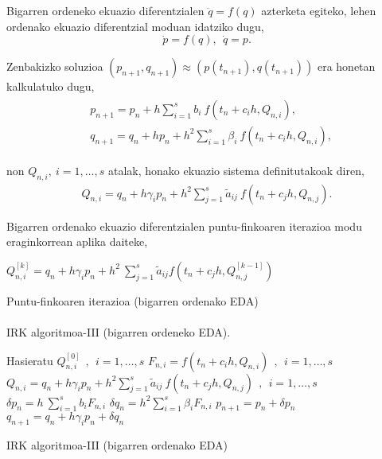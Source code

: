 Bigarren ordeneko ekuazio diferentzialen $\ddot{q}=f(q)$ azterketa egiteko, lehen ordenako ekuazio diferentzial moduan idatziko dugu,
\begin{equation*}
\dot{p}=f(q), \ \ \dot{q}=p.
\end{equation*}

Zenbakizko soluzioa $(p_{n+1},q_{n+1}) \approx (p(t_{n+1}),q(t_{n+1}))$ era honetan kalkulatuko dugu,
\begin{align}
\begin{split}
&p_{n+1}=p_n+ h \sum\limits_{i=1}^{s} b_i \ f(t_n+c_ih,Q_{n,i}),\\
&q_{n+1}=q_n+ h p_{n} + h^2 \sum\limits_{i=1}^{s} \beta_i \ f(t_n+c_ih,Q_{n,i}),
\end{split}
\end{align}

non $Q_{n,i}, \ i=1,\dots,s$ atalak, honako ekuazio sistema definitutakoak diren, 
\begin{align}
Q_{n,i}=q_n+ h\gamma_i p_n+ h^2 \sum\limits_{j=1}^{s} \tilde{a}_{ij} \ f(t_n+c_jh,Q_{n,j}).
\end{align}

Bigarren ordenako ekuazio diferentzialen puntu-finkoaren iterazioa modu eraginkorrean aplika daiteke,

\begin{algorithm}[H]
  {
   $Q_{n,i}^{[k]}=q_{n}+h \gamma_i p_{n}+ h^2 \ \sum\limits_{j=1}^{s} \tilde{a}_{ij} f(t_n+c_jh,Q_{n,j}^{[k-1]}) $\;  
  }
 \caption{Puntu-finkoaren iterazioa (bigarren ordenako EDA)}
\end{algorithm} 

\paragraph*{}IRK algoritmoa-III (bigarren ordeneko EDA).

\begin{algorithm}[H]
 \BlankLine
  {
   \BlankLine
   Hasieratu  $Q_{n,i}^{[0]} \ \ , \ \ i=1,\dots,s $\;
    \BlankLine
   {
    \BlankLine 
    $F_{n,i}=f(t_n+c_ih,Q_{n,i}) \ \ , \ \  i=1,\dots,s$\;
    $Q_{n,i}=q_n+ h\gamma_i p_n+ h^2 \sum\limits_{j=1}^{s} \tilde{a}_{ij} \ f(t_n+c_jh,Q_{n,j}) \ \ , \ \  i=1,\dots,s$\;  
   }
   \BlankLine
    $\delta p_n=h \ \sum\limits_{i=1}^{s} b_i F_{n,i}$\;
    $\delta q_n=h^2 \sum\limits_{i=1}^{s} \beta_i F_{n,i}$\;    
    $p_{n+1}=p_{n}+ \delta p_n $\;
    $q_{n+1}=q_{n}+ h\gamma_i p_n+\delta q_n $\;
   \BlankLine
 }
 \caption{IRK algoritmoa-III (bigarren ordenako EDA)}\label{alg:IRK2}
\end{algorithm}


